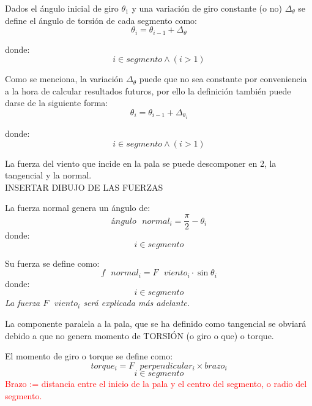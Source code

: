 \begin{definicion}
Dados el ángulo inicial de giro $\theta_1 $ y una variación de giro constante (o no) $\Delta_\theta$ se define el ángulo de torsión de cada segmento como:
$$\theta_i = \theta_{i-1} + \Delta_\theta$$ 

    donde:
 $$i \in segmento \wedge (i > 1)$$
 
\label{def:theta_cte}
\end{definicion}



\begin{definicion}
Como se menciona, la variación $\Delta_\theta$ puede que no sea constante por conveniencia a la hora de calcular resultados futuros, por ello la definición también puede darse de la siguiente forma:
$$\theta_i = \theta_{i-1} + \Delta_{\theta_{i}}$$ 

    donde:
 $$i \in segmento \wedge (i > 1)$$
\label{def:theta_nocte}
\end{definicion}


La fuerza del viento que incide en la pala se puede descomponer en 2, la tangencial y la normal. \\

 INSERTAR DIBUJO DE LAS FUERZAS \\
 
 \begin{definicion}
 La fuerza normal genera un ángulo de:
 $$ ángulo \text{ } normal_i = \dfrac{\pi}{2} - \theta_i $$
 donde:
 $$ i \in segmento$$
 \end{definicion}

 \begin{definicion}
  Su fuerza se define como:
  $$ f \text{ } normal_i = F \text{ } viento_i \cdot \sin{\theta_i}$$
   donde:
 $$ i \in segmento$$
   \textit{La fuerza $F \text{ } viento_i$ será explicada más adelante.}
  \label{def:fuerza_normal}
 \end{definicion}

 
 La componente paralela a la pala, que se ha definido como tangencial se obviará debido a que no genera momento de TORSIÓN (o giro o que) o torque. 
 
 
 
 \begin{definicion}
El momento de giro o torque se define como:
 $$ torque_i = F \text{ } perpendicular_i \times brazo_i$$
 $$ i \in segmento$$
 \label{def:torque} %
 \textcolor{red}{Brazo := distancia entre el inicio de la pala y el centro del segmento, o radio del segmento.} \\
 \end{definicion}

